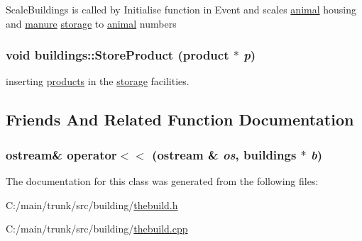 \label{classbuildings_a4801905be37d8b7a0ea0487879a79cc3}
ScaleBuildings is called by Initialise function in Event and scales \hyperlink{classanimal}{animal} housing and \hyperlink{classmanure}{manure} \hyperlink{classstorage}{storage} to \hyperlink{classanimal}{animal} numbers \hypertarget{classbuildings_a5ef204b7f1eace35543ea66a8a5c5a39}{
\subsubsection[{StoreProduct}]{\setlength{\rightskip}{0pt plus 5cm}void buildings::StoreProduct ({\bf product} $\ast$ {\em p})}}
\label{classbuildings_a5ef204b7f1eace35543ea66a8a5c5a39}
inserting \hyperlink{classproducts}{products} in the \hyperlink{classstorage}{storage} facilities. 

\subsection{Friends And Related Function Documentation}
\hypertarget{classbuildings_a2af3e65c7b1426fa2dd80c658ca99cd5}{
\subsubsection[{operator$<$$<$}]{\setlength{\rightskip}{0pt plus 5cm}ostream\& operator$<$$<$ (ostream \& {\em os}, \/  {\bf buildings} $\ast$ {\em b})}}
\label{classbuildings_a2af3e65c7b1426fa2dd80c658ca99cd5}


The documentation for this class was generated from the following files:\begin{DoxyCompactItemize}
\item 
C:/main/trunk/src/building/\hyperlink{thebuild_8h}{thebuild.h}\item 
C:/main/trunk/src/building/\hyperlink{thebuild_8cpp}{thebuild.cpp}\end{DoxyCompactItemize}

